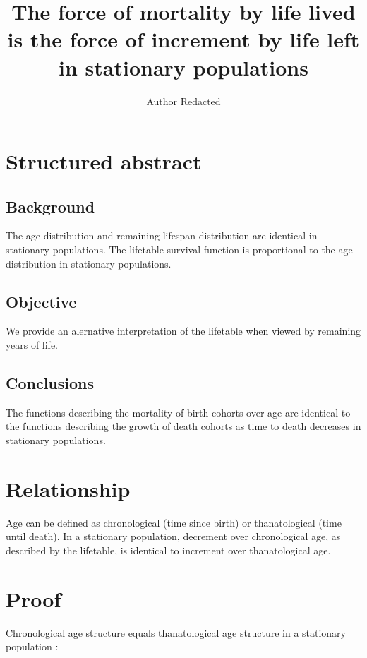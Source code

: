 \documentclass{article}
\begin{document}
\title{The force of mortality by life lived is the force of increment by life
left in stationary populations}
\author{Author Redacted}
\maketitle

\section*{Structured abstract}

\subsection*{Background}
The age distribution and remaining lifespan distribution are identical in
stationary populations. The lifetable survival function is proportional to the
age distribution in stationary populations.

\subsection*{Objective}
We provide an alernative interpretation of the lifetable when viewed by
remaining years of life.

\subsection*{Conclusions}
The functions describing the mortality of birth cohorts over age are identical
to the functions describing the growth of death cohorts as time to death decreases in stationary populations.
\vspace{2cm}
\section*{Relationship}

Age can be defined as chronological (time since birth) or thanatological (time
until death). In a stationary population, decrement over
chronological age, as described by the lifetable, is
identical to increment over thanatological age.

\section*{Proof}

Chronological age structure equals thanatological age structure in a stationary
population \citep{brouard1989mouvements,vaupel2009life}:
\end{document}
